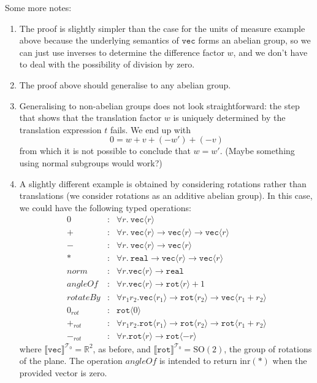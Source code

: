 \documentclass[natbib,preprint]{sigplanconf}
\newcommand{\tyPrim}[2]{\texttt{#1}\langle #2 \rangle}
\newcommand{\tyPrimNm}[1]{\texttt{#1}}
\newcommand{\tyPrimSem}[1]{\llbracket \tyPrimNm{#1} \rrbracket^{\mathcal{T}_0}}
\begin{document}
Some more notes:
\begin{enumerate}
\item The proof is slightly simpler than the case for the units of
  measure example above because the underlying semantics of
  $\tyPrimNm{vec}$ forms an abelian group, so we can just use inverses
  to determine the difference factor $w$, and we don't have to deal
  with the possibility of division by zero.
\item The proof above should generalise to any abelian group.
\item Generalising to non-abelian groups does not look
  straightforward: the step that shows that the translation factor $w$
  is uniquely determined by the translation expression $t$ fails. We
  end up with
  \begin{displaymath}
    0 = w + v + (-w') + (-v)
  \end{displaymath}
  from which it is not possible to conclude that $w = w'$. (Maybe
  something using normal subgroups would work?)
\item A slightly different example is obtained by considering
  rotations rather than translations (we consider rotations as an
  additive abelian group). In this case, we could have the following
  typed operations:
  \begin{eqnarray*}
    0 & : & \forall r.\ \tyPrim{vec}{r} \\
    + & : & \forall r.\ \tyPrim{vec}{r} \to \tyPrim{vec}{r} \to \tyPrim{vec}{r} \\
    - & : & \forall r.\ \tyPrim{vec}{r} \to \tyPrim{vec}{r} \\
    * & : & \forall r.\ \tyPrimNm{real} \to \tyPrim{vec}{r} \to \tyPrim{vec}{r} \\
    \mathit{norm} & : & \forall r. \tyPrim{vec}{r} \to \tyPrimNm{real} \\
    \mathit{angleOf} & : & \forall r. \tyPrim{vec}{r} \to \tyPrim{rot}{r} + 1 \\
    \mathit{rotateBy} & : & \forall r_1 r_2. \tyPrim{vec}{r_1} \to \tyPrim{rot}{r_2} \to \tyPrim{vec}{r_1 + r_2} \\
    0_{\mathit{rot}} & : & \tyPrim{rot}{0} \\
    +_{\mathit{rot}} & : & \forall r_1 r_2. \tyPrim{rot}{r_1} \to \tyPrim{rot}{r_2} \to \tyPrim{rot}{r_1 + r_2} \\
    -_{\mathit{rot}} & : & \forall r. \tyPrim{rot}{r} \to \tyPrim{rot}{-r}
  \end{eqnarray*}
  where $\tyPrimSem{vec} = \mathbb{R}^2$, as before, and
  $\tyPrimSem{rot} = \mathrm{SO}(2)$, the group of rotations of the
  plane. The operation $\mathit{angleOf}$ is intended to return
  $\mathrm{inr}(*)$ when the provided vector is zero.


\end{enumerate}
\end{document}
